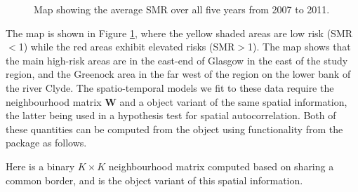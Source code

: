 \documentclass[article, nojss]{jss}
\begin{document}
\begin{figure}
\centering 
{}
\caption{Map showing the average SMR over all five years from 2007 to 2011.\label{smr_map}}
\end{figure} 


The map is shown in Figure \ref{smr_map}, where the yellow shaded areas are low risk (SMR$<$1) while the red areas exhibit elevated risks (SMR$>$1). The map shows that the main high-risk areas are in the east-end of Glasgow in the east of the study region, and the Greenock area in the far west of the region on the lower bank of the river Clyde. The spatio-temporal models we fit to these data require the neighbourhood matrix $\mathbf{W}$ and a  object variant of the same spatial information, the latter being used in a hypothesis test for spatial autocorrelation. Both of these quantities can be computed from the   object using functionality from the  package as follows.

\begin{Schunk}
\end{Schunk}

Here  is a binary $K\times K$ neighbourhood matrix computed based on sharing a common border, and  is the  object variant of this spatial information.
\end{document}
